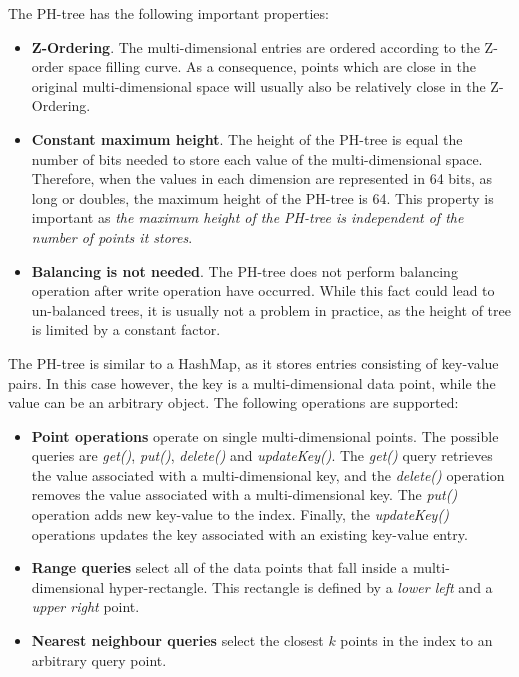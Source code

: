 \documentclass[11pt,a4paper]{globis-book}
\begin{document}
The PH-tree has the following important properties:
\begin{itemize}
    \item \textbf{Z-Ordering}. The multi-dimensional entries are ordered according to the Z-order space filling curve. As a consequence, points which are close in the original multi-dimensional space will usually also be relatively close in the Z-Ordering.
    \item \textbf{Constant maximum height}. The height of the PH-tree is equal the number of bits needed to store each value of the multi-dimensional space. Therefore, when the values in each dimension are represented in 64 bits, as long or doubles, the maximum height of the PH-tree is 64. This property is important as \textit{the maximum height of the PH-tree is independent of the number of points it stores}.
    \item \textbf{Balancing is not needed}. The PH-tree does not perform balancing operation after write operation have occurred. While this fact could lead to un-balanced trees, it is usually not a problem in practice, as the height of tree is limited by a constant factor.
\end{itemize}

The PH-tree is similar to a HashMap, as it stores entries consisting of key-value pairs. In this case however, the key is a multi-dimensional data point, while the value can be an arbitrary object. The following operations are supported:
\begin{itemize}
    \item \textbf{Point operations} operate on single multi-dimensional points. The possible queries are \textit{get()}, \textit{put()}, \textit{delete()} and \textit{updateKey()}. The \textit{get()} query retrieves the value associated with a multi-dimensional key, and the \textit{delete()} operation removes the value associated with a multi-dimensional key. The \textit{put()} operation adds new key-value to the index. Finally, the \textit{updateKey()} operations updates the key associated with an existing key-value entry.
    \item \textbf{Range queries} select all of the data points that fall inside a multi-dimensional hyper-rectangle. This rectangle is defined by a \textit{lower left} and a \textit{upper right} point. 
    \item \textbf{Nearest neighbour queries} select the closest $k$ points in the index to an arbitrary query point. 
\end{itemize}
\end{document}

